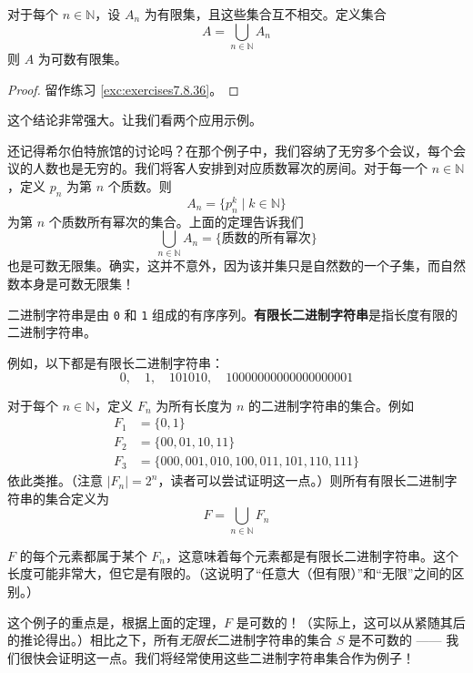 \begin{corollary}\label{corollary7.6.23}
    对于每个 $n \in \mathbb{N}$，设 $A_n$ 为有限集，且这些集合互不相交。定义集合
    \[A = \bigcup_{n \in \mathbb{N}} A_n\]
    则 $A$ 为可数有限集。
\end{corollary}

\begin{proof}
    留作练习 \ref{exc:exercises7.8.36}。
\end{proof}

这个结论非常强大。让我们看两个应用示例。

\begin{example}[所有质数幂次的集合]
    还记得希尔伯特旅馆的讨论吗？在那个例子中，我们容纳了无穷多个会议，每个会议的人数也是无穷的。我们将客人安排到对应质数幂次的房间。对于每一个 $n \in \mathbb{N}$，定义 $p_n$ 为第 $n$ 个质数。则
    \[A_n = \{p_n^k \mid k \in \mathbb{N}\}\]
    为第 $n$ 个质数所有幂次的集合。上面的定理告诉我们
    \[\bigcup_{n \in \mathbb{N}} A_n = \{\text{质数的所有幂次}\}\]
    也是可数无限集。确实，这并不意外，因为该并集只是自然数的一个子集，而自然数本身是可数无限集！
\end{example}

\begin{example}[所有有限长二进制字符串的集合]\label{ex:example7.6.25}
    二进制字符串是由 \verb|0| 和 \verb|1| 组成的有序序列。\textbf{有限长二进制字符串}是指长度有限的二进制字符串。

    例如，以下都是有限长二进制字符串：
    \[0, \quad 1, \quad 101010, \quad 10000000000000000001 \]

    对于每个 $n \in \mathbb{N}$，定义 $F_n$ 为所有长度为 $n$ 的二进制字符串的集合。例如
    \begin{align*}
        F_1 & = \{ 0 , 1 \}                                         \\
        F_2 & = \{ 00 , 01 , 10 , 11 \}                             \\
        F_3 & = \{ 000 , 001 , 010 , 100 , 011 , 101 , 110 , 111 \}
    \end{align*}
    依此类推。（注意 $|F_n| = 2^n$，读者可以尝试证明这一点。）则所有有限长二进制字符串的集合定义为
    \[F = \bigcup_{n \in \mathbb{N}} F_n\]

    $F$ 的每个元素都属于某个 $F_n$，这意味着每个元素都是有限长二进制字符串。这个长度可能非常大，但它是有限的。（这说明了``任意大（但有限）''和``无限''之间的区别。）

    这个例子的重点是，根据上面的定理，$F$ 是可数的！（实际上，这可以从紧随其后的推论得出。）相比之下，所有\emph{无限长}二进制字符串的集合 $S$ 是不可数的 —— 我们很快会证明这一点。我们将经常使用这些二进制字符串集合作为例子！
\end{example}

